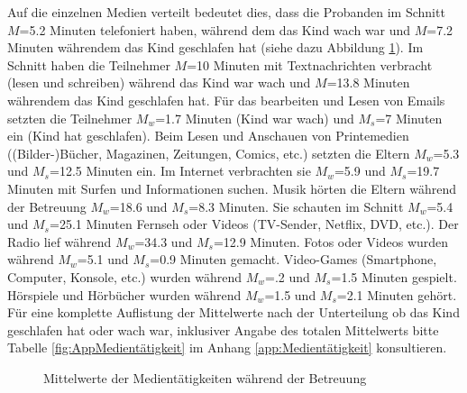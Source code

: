 Auf die einzelnen Medien verteilt bedeutet dies, dass die Probanden im Schnitt $M$=5.2 Minuten telefoniert haben, während dem das Kind wach war und $M$=7.2 Minuten währendem das Kind geschlafen hat (siehe dazu Abbildung \ref{fig:Medientätigkeit}). Im Schnitt haben die Teilnehmer $M$=10 Minuten mit Textnachrichten verbracht (lesen und schreiben) während das Kind war wach und $M$=13.8 Minuten währendem das Kind geschlafen hat. Für das bearbeiten und Lesen von Emails setzten die Teilnehmer $M_{w}$=1.7 Minuten (Kind war wach) und $M_{s}$=7 Minuten ein (Kind hat geschlafen). Beim Lesen und Anschauen von Printemedien ((Bilder-)Bücher, Magazinen, Zeitungen, Comics, etc.) setzten die Eltern $M_{w}$=5.3 und $M_{s}$=12.5 Minuten ein. Im Internet verbrachten sie $M_{w}$=5.9 und $M_{s}$=19.7 Minuten mit Surfen und Informationen suchen. Musik hörten die Eltern während der Betreuung $M_{w}$=18.6 und $M_{s}$=8.3 Minuten. Sie schauten im Schnitt $M_{w}$=5.4 und $M_{s}$=25.1 Minuten Fernseh oder Videos (TV-Sender, Netflix, DVD, etc.). Der Radio lief während $M_{w}$=34.3 und $M_{s}$=12.9 Minuten. Fotos oder Videos wurden während $M_{w}$=5.1 und $M_{s}$=0.9 Minuten gemacht. Video-Games (Smartphone, Computer, Konsole, etc.) wurden während $M_{w}$=.2 und $M_{s}$=1.5 Minuten gespielt. Hörspiele und Hörbücher wurden während $M_{w}$=1.5 und $M_{s}$=2.1 Minuten gehört. Für eine komplette Auflistung der Mittelwerte nach der Unterteilung ob das Kind geschlafen hat oder wach war, inklusiver Angabe des totalen Mittelwerts bitte Tabelle \ref{fig:AppMedientätigkeit} im Anhang \ref{app:Medientätigkeit} konsultieren.

\begin{figure}%
\caption{Mittelwerte der Medientätigkeiten während der Betreuung}\label{fig:Medientätigkeit}
{}
\end{figure}

